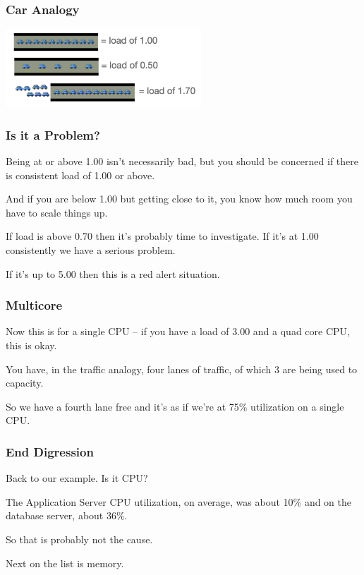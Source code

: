 \begin{frame}
\frametitle{Car Analogy}

\begin{center}
	\includegraphics[width=0.55\textwidth]{images/car-analogy.png}
\end{center}

\end{frame}



\begin{frame}
\frametitle{Is it a Problem?}

Being at or above 1.00 isn't necessarily bad, but you should be concerned if there is consistent load of 1.00 or above. 

And if you are below 1.00 but getting close to it, you know how much room you have to scale things up.

If load is above 0.70 then it's probably time to investigate. If it's at 1.00 consistently we have a serious problem. 

If it's up to 5.00 then this is a red alert situation.

\end{frame}



\begin{frame}
\frametitle{Multicore}

Now this is for a single CPU -- if you have a load of 3.00 and a quad core CPU, this is okay. 

You have, in the traffic analogy, four lanes of traffic, of which 3 are being used to capacity.

So we have a fourth lane free and it's as if we're at 75\% utilization on a single CPU.

\end{frame}



\begin{frame}
\frametitle{End Digression}


Back to our example. Is it CPU? 

The Application Server CPU utilization, on average, was about 10\% and on the database server, about 36\%. 

So that is probably not the cause. 

Next on the list is memory. 

\end{frame}



